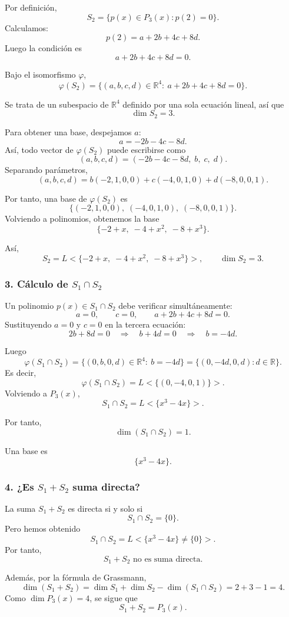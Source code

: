 \documentclass[12pt]{article}
\begin{document}
Por definición,
\[
S_2=\{p(x)\in P_3(x): p(2)=0\}.
\]
Calculamos:
\[
p(2)=a+2b+4c+8d.
\]
Luego la condición es
\[
a+2b+4c+8d=0.
\]

Bajo el isomorfismo \(\varphi\),
\[
\varphi(S_2)=\{(a,b,c,d)\in\mathbb{R}^4:\ a+2b+4c+8d=0\}.
\]

Se trata de un subespacio de \(\mathbb{R}^4\) definido por una sola ecuación lineal, así que
\[
\dim S_2=3.
\]

Para obtener una base, despejamos \(a\):
\[
a=-2b-4c-8d.
\]
Así, todo vector de \(\varphi(S_2)\) puede escribirse como
\[
(a,b,c,d)=(-2b-4c-8d,\; b,\; c,\; d).
\]
Separando parámetros,
\[
(a,b,c,d)
=
b(-2,1,0,0)+c(-4,0,1,0)+d(-8,0,0,1).
\]

Por tanto, una base de \(\varphi(S_2)\) es
\[
\{(-2,1,0,0),\;(-4,0,1,0),\;(-8,0,0,1)\}.
\]
Volviendo a polinomios, obtenemos la base
\[
\{-2+x,\;-4+x^2,\;-8+x^3\}.
\]

Así,
\[
S_2=L<\{-2+x,\;-4+x^2,\;-8+x^3\}>,
\qquad
\dim S_2=3.
\]

\subsubsection*{3. Cálculo de \(S_1\cap S_2\)}

Un polinomio \(p(x)\in S_1\cap S_2\) debe verificar simultáneamente:
\[
a=0,\qquad c=0,\qquad a+2b+4c+8d=0.
\]
Sustituyendo \(a=0\) y \(c=0\) en la tercera ecuación:
\[
2b+8d=0
\quad\Longrightarrow\quad
b+4d=0
\quad\Longrightarrow\quad
b=-4d.
\]

Luego
\[
\varphi(S_1\cap S_2)=\{(0,b,0,d)\in\mathbb{R}^4:\ b=-4d\}
=\{(0,-4d,0,d): d\in\mathbb{R}\}.
\]
Es decir,
\[
\varphi(S_1\cap S_2)=L <\{(0,-4,0,1)\}>.
\]
Volviendo a \(P_3(x)\),
\[
S_1\cap S_2=L<\{x^3-4x\}>.
\]

Por tanto,
\[
\dim(S_1\cap S_2)=1.
\]

Una base es
\[
\{x^3-4x\}.
\]

\subsubsection*{4. ¿Es \(S_1+S_2\) suma directa?}

La suma \(S_1+S_2\) es directa si y solo si
\[
S_1\cap S_2=\{0\}.
\]
Pero hemos obtenido
\[
S_1\cap S_2=L<\{x^3-4x\}\neq\{0\}>.
\]
Por tanto,
\[
S_1+S_2 \text{ no es suma directa.}
\]

Además, por la fórmula de Grassmann,
\[
\dim(S_1+S_2)=\dim S_1+\dim S_2-\dim(S_1\cap S_2)=2+3-1=4.
\]
Como \(\dim P_3(x)=4\), se sigue que
\[
S_1+S_2=P_3(x).
\]
\end{document}
